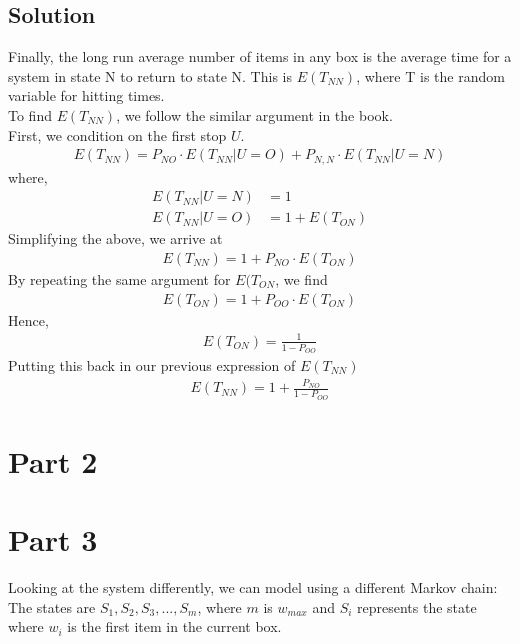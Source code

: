 \documentclass[10pt,a4paper]{article}
\begin{document}
\subsection*{Solution}
Finally, the long run average number of items in any box is the average time for a system in state N to return to state N. This is $ E(T_{NN}) $, where T is the random variable for hitting times. \\
To find $ E(T_{NN}) $, we follow the similar argument in the book. \\
First, we condition on the first stop $ U $. 
\begin{align*}
E(T_{NN}) = P_{NO}\cdot E(T_{NN}|U=O)+P_{N,N}\cdot E(T_{NN}|U=N)
\end{align*}
where,\\
\begin{align*}
E(T_{NN}|U=N) &= 1 \\
E(T_{NN}|U=O) &= 1+E(T_{ON})
\end{align*}
Simplifying the above, we arrive at\\
\begin{align*}
E(T_{NN}) = 1+ P_{NO}\cdot E(T_{ON})
\end{align*}
By repeating the same argument for $ E(T_{ON} $, we find \\
\begin{align*}
E(T_{ON}) = 1+ P_{OO}\cdot E(T_{ON})
\end{align*}
Hence, 
\begin{align*}
E(T_{ON}) = \frac{1}{1 - P_{OO}}
\end{align*}
Putting this back in our previous expression of $ E(T_{NN}) $
\begin{align*}
E(T_{NN}) = 1+ \frac{P_{NO}}{1 - P_{OO}}
\end{align*}


\section{Part 2}



\section{Part 3}
Looking at the system differently, we can model using a different Markov chain:\\
The states are $ S_1, S_2, S_3, ..., S_m$, where $m$ is $w_{max}$ and $S_i$ represents the state where $w_i$ is the first item in the current box.\\
\end{document}
